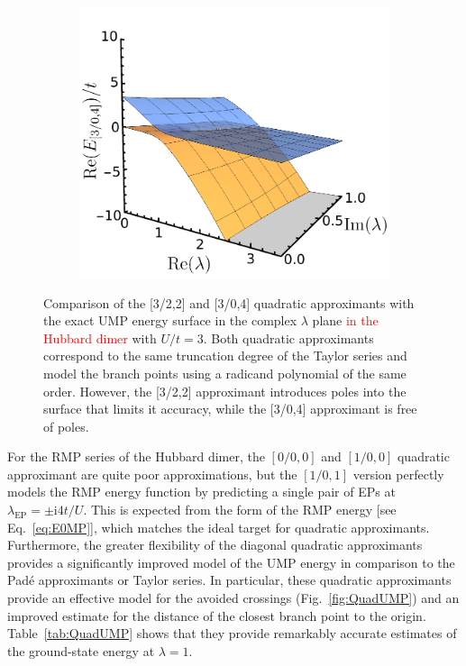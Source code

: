 \documentclass[aps,prb,reprint,noshowkeys,superscriptaddress]{revtex4-1}
\newcommand{\titou}[1]{\textcolor{red}{#1}}
\renewcommand{\i}{\mathrm{i}} %
\begin{document}
\begin{figure}
	\begin{subfigure}{0.32\textwidth}
        \includegraphics[height=0.85\textwidth]{fig11c}	
    \end{subfigure}
\caption{%
Comparison of the [3/2,2] and [3/0,4] quadratic approximants with the exact UMP energy surface in the complex $\lambda$ 
plane \titou{in the Hubbard dimer} with $U/t = 3$. 
Both quadratic approximants correspond to the same truncation degree of the Taylor series and model the branch points 
using a radicand polynomial of the same order.
However, the [3/2,2] approximant introduces poles into the surface that limits it accuracy, while the [3/0,4] approximant
is free of poles.}
\label{fig:nopole_quad}
\end{figure}

For the RMP series of the Hubbard dimer, the $[0/0,0]$ and $[1/0,0]$ quadratic approximant 
are quite poor approximations, but the $[1/0,1]$ version perfectly models the RMP energy
function by predicting a single pair of EPs at $\lambda_\text{EP} = \pm \i 4t/U$.
This is expected from the form of the RMP energy [see Eq.~\eqref{eq:E0MP}], which matches 
the ideal target for quadratic approximants.
Furthermore, the greater flexibility of the diagonal quadratic approximants provides a significantly
improved model of the UMP energy in comparison to the Pad\'e approximants or Taylor series.
In particular, these quadratic approximants provide an effective model for the avoided crossings 
(Fig.~\ref{fig:QuadUMP}) and an improved estimate for the distance of the 
closest branch point  to the origin.
Table~\ref{tab:QuadUMP} shows that they provide remarkably accurate 
estimates of the ground-state energy at $\lambda = 1$.
\end{document}
